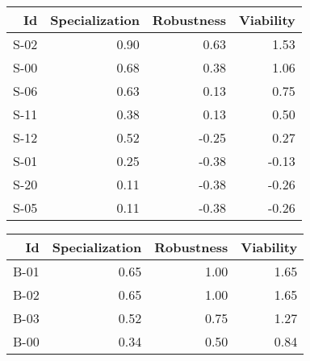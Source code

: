 


\begin{tabular}{ | r | r | r | r | }
    \hline
                    Id  &  Specialization  &      Robustness  &       Viability  \\
    \hline
    \hline
                  S-02  &            0.90  &            0.63  &            1.53  \\
    \hline
                  S-00  &            0.68  &            0.38  &            1.06  \\
    \hline
                  S-06  &            0.63  &            0.13  &            0.75  \\
    \hline
                  S-11  &            0.38  &            0.13  &            0.50  \\
    \hline
                  S-12  &            0.52  &           -0.25  &            0.27  \\
    \hline
                  S-01  &            0.25  &           -0.38  &           -0.13  \\
    \hline
                  S-20  &            0.11  &           -0.38  &           -0.26  \\
    \hline
                  S-05  &            0.11  &           -0.38  &           -0.26  \\
    \hline
\end{tabular}


\begin{tabular}{ | r | r | r | r | }
    \hline
                    Id  &  Specialization  &      Robustness  &       Viability  \\
    \hline
    \hline
                  B-01  &            0.65  &            1.00  &            1.65  \\
    \hline
                  B-02  &            0.65  &            1.00  &            1.65  \\
    \hline
                  B-03  &            0.52  &            0.75  &            1.27  \\
    \hline
                  B-00  &            0.34  &            0.50  &            0.84  \\
    \hline
\end{tabular}


